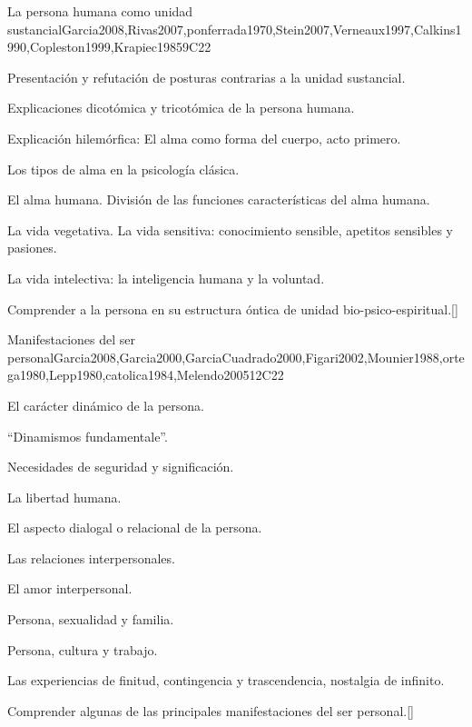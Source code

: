 \begin{syllabus}
\begin{unit}{}{La persona humana como unidad sustancial}{Garcia2008,Rivas2007,ponferrada1970,Stein2007,Verneaux1997,Calkins1990,Copleston1999,Krapiec1985}{9}{C22}
\begin{topics}
	\item Presentación y refutación de posturas contrarias a la unidad sustancial.
	\item Explicaciones dicotómica y tricotómica de la persona humana. 
	\item Explicación hilemórfica: El alma como forma del cuerpo, acto primero.
	\item Los tipos de alma en la psicología clásica.
	\item El alma humana. División de las funciones características del alma humana.
	\item La vida vegetativa. La vida sensitiva: conocimiento sensible, apetitos sensibles y pasiones.
	\item La vida intelectiva: la inteligencia humana y la voluntad.
\end{topics}
\begin{learningoutcomes}
	\item Comprender a la persona en su estructura óntica de unidad bio-psico-espiritual.[\Usage]
\end{learningoutcomes}
\end{unit}

\begin{unit}{}{Manifestaciones del ser personal}{Garcia2008,Garcia2000,GarciaCuadrado2000,Figari2002,Mounier1988,ortega1980,Lepp1980,catolica1984,Melendo2005}{12}{C22}
\begin{topics}
	\item El carácter dinámico de la persona.
	\item ``Dinamismos fundamentale''.
	\item Necesidades de seguridad y significación.
	\item La libertad humana.
	\item El aspecto dialogal o relacional de la persona. 
	\item Las relaciones interpersonales. 
	\item El amor interpersonal.
	\item Persona, sexualidad y familia.
	\item Persona, cultura y trabajo.
	\item Las experiencias de finitud, contingencia y trascendencia, nostalgia de infinito.
\end{topics}
\begin{learningoutcomes}
	\item Comprender algunas de las principales manifestaciones del ser personal.[\Usage]
\end{learningoutcomes}
\end{unit}


\end{syllabus}
